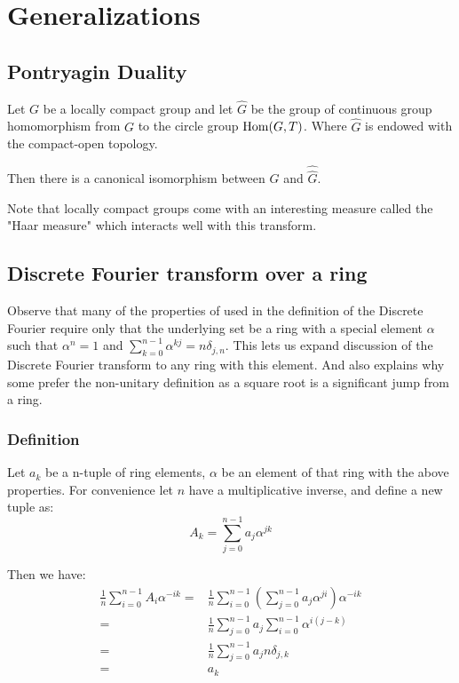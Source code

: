 \chapter{Generalizations}

\section{Pontryagin Duality}
Let $G$ be a locally compact group and let $\hat{G}$ be the group of continuous group homomorphism from $G$ to the circle group $\operatorname{Hom}(G,T)$. Where $\hat{G}$ is endowed with the compact-open topology.

Then there is a canonical isomorphism between $G$ and $\hat{\hat{G}}$.

Note that locally compact groups come with an interesting measure called the "Haar measure" which interacts well with this transform.

\section{Discrete Fourier transform over a ring}
\label{sec:ring}
Observe that many of the properties of used in the definition of the Discrete Fourier require only that the underlying set be a ring with a special element $\alpha$ such that $\alpha^n = 1$ and $\sum_{k=0}^{n-1}\alpha^{kj} = n\delta_{j,n}$.
This lets us expand discussion of the Discrete Fourier transform to any ring with this element.
And also explains why some prefer the non-unitary definition as a square root is a significant jump from a ring.

\subsection{Definition}
Let $a_k$ be a n-tuple of ring elements, $\alpha$ be an element of that ring with the above properties. 
For convenience let $n$ have a multiplicative inverse, and define a new tuple as:
\[A_k = \sum_{j=0}^{n-1}a_j\alpha^{jk}\]

Then we have:
\begin{equation*}
\begin{aligned}
	\frac{1}{n}\sum_{i=0}^{n-1}A_i\alpha^{-ik} =& 
	\frac{1}{n}\sum_{i=0}^{n-1}\left(\sum_{j=0}^{n-1}a_j\alpha^{ji}\right)\alpha^{-ik} \\ 
	=&\frac{1}{n}\sum_{j=0}^{n-1}a_j\sum_{i=0}^{n-1}\alpha^{i(j-k)} \\ 
	=&\frac{1}{n}\sum_{j=0}^{n-1}a_jn\delta_{j,k} \\ 
	=&a_k \\ 
\end{aligned}
\end{equation*}

